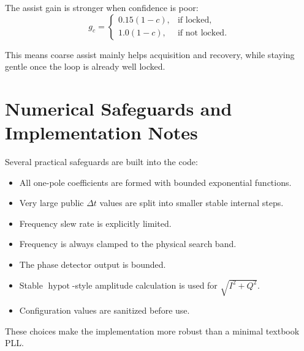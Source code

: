 \documentclass[conference]{IEEEtran}
\begin{document}
The assist gain is stronger when confidence is poor:
\begin{equation}
  g_c =
  \begin{cases}
    0.15(1-c), & \text{if locked},\\[4pt]
    1.0(1-c), & \text{if not locked}.
  \end{cases}
\end{equation}

This means coarse assist mainly helps acquisition and recovery, while staying
gentle once the loop is already well locked.

\section{Numerical Safeguards and Implementation Notes}

Several practical safeguards are built into the code:

\begin{itemize}[leftmargin=1.4em]
  \item All one-pole coefficients are formed with bounded exponential
        functions.
  \item Very large public \(\Delta t\) values are split into smaller stable
        internal steps.
  \item Frequency slew rate is explicitly limited.
  \item Frequency is always clamped to the physical search band.
  \item The phase detector output is bounded.
  \item Stable \(\operatorname{hypot}\)-style amplitude calculation is used for
        \(\sqrt{I^2+Q^2}\).
  \item Configuration values are sanitized before use.
\end{itemize}

These choices make the implementation more robust than a minimal textbook PLL.
\end{document}
